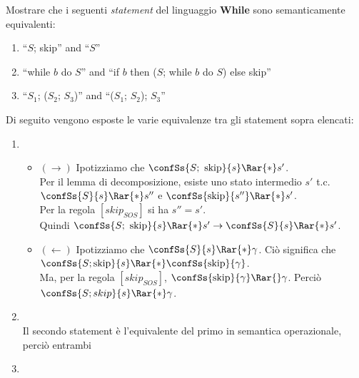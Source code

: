 {
  Mostrare che i seguenti \textit{statement} del linguaggio \textbf{While} sono
  semanticamente equivalenti:
  \begin{enumerate}[label=\alph*)]
    \item ``$S$; skip'' and ``$S$''
    \item ``while $b$ do $S$'' and
      ``if $b$ then ($S$; while $b$ do $S$) else skip''
    \item ``$S_1$; ($S_2$; $S_3$)'' and ``($S_1$; $S_2$); $S_3$''
  \end{enumerate}
}
{
  Di seguito vengono esposte le varie equivalenze tra gli statement sopra
  elencati:

  \begin{enumerate}[label=\alph*)]
    \item {}
    \begin{itemize}
      \item $(\rightarrow)$ Ipotizziamo che
      $\confSs{S;\mbox{ skip}}{s} \Rar{*} s'$. \\
      Per il lemma di decomposizione, esiste uno stato intermedio $s'$ t.c.
      $\confSs{S}{s} \Rar{*} s''$ e $\confSs{\mbox{skip}}{s''} \Rar{*} s'$. \\
      Per la regola $[skip_{SOS}]$ si ha $s'' = s'$. \\
      Quindi $\confSs{S;\mbox{ skip}}{s} \Rar{*} s' \rightarrow \confSs{S}{s} 
      \Rar{*} s'$.

      \item $(\leftarrow)$ Ipotizziamo che $\confSs{S}{s} \Rar{*} \gamma$. Ciò
      significa che
      $\confSs{S; \mbox{skip}}{s} \Rar{*} \confSs{\mbox{skip}}{\gamma}$. \\
      Ma, per la regola $[skip_{SOS}]$,
      $\confSs{\mbox{skip}}{\gamma} \Rar{} \gamma$. Perciò
      $\confSs{S; skip}{s} \Rar{*} \gamma$.
    \end{itemize}


    \item {} \\
      Il secondo statement è
      l'equivalente del primo in semantica operazionale, perciò entrambi

    \item {} 
  \end{enumerate}
}
